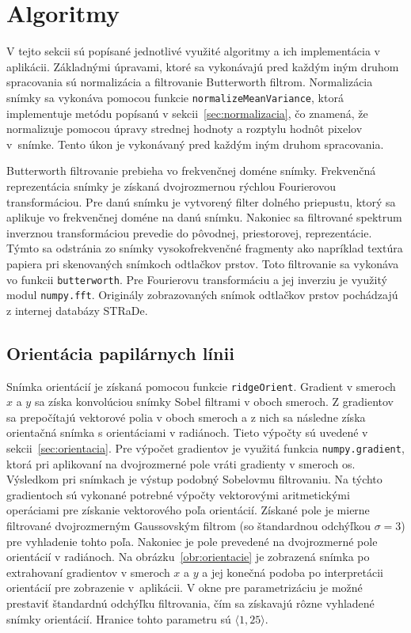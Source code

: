   \section{Algoritmy} \label{sec:algoritmy}
  V tejto sekcii sú popísané jednotlivé využité algoritmy a ich implementácia v aplikácii.
  Základnými úpravami, ktoré sa vykonávajú pred každým iným druhom spracovania sú normalizácia a filtrovanie Butterworth filtrom.
  Normalizácia snímky sa vykonáva pomocou funkcie \texttt{normalizeMeanVariance}, ktorá implementuje metódu
  popísanú v sekcii~{\ref{sec:normalizacia}}, čo znamená, že normalizuje pomocou úpravy strednej hodnoty a rozptylu hodnôt pixelov v~snímke. Tento úkon je
  vykonávaný pred každým iným druhom spracovania.

  Butterworth filtrovanie prebieha vo frekvenčnej doméne snímky. Frekvenčná reprezentácia snímky je získaná dvojrozmernou rýchlou Fourierovou transformáciou.
  Pre danú snímku je vytvorený filter dolného priepustu, ktorý sa aplikuje vo frekvenčnej doméne na danú snímku. Nakoniec sa filtrované spektrum inverznou
  transformáciou prevedie do pôvodnej, priestorovej, reprezentácie. Týmto sa odstránia zo snímky vysokofrekvenčné fragmenty ako napríklad textúra papiera
  pri skenovaných snímkoch odtlačkov prstov. Toto filtrovanie sa vykonáva vo funkcii \texttt{butterworth}. Pre Fourierovu transformáciu a jej
  inverziu je využitý modul \texttt{numpy.fft}. Originály zobrazovaných snímok odtlačkov prstov pochádzajú z internej databázy STRaDe.

  \subsection{Orientácia papilárnych línii}
  Snímka orientácií je získaná pomocou funkcie \texttt{ridgeOrient}. Gradient v smeroch $x$ a $y$ sa získa konvolúciou snímky Sobel filtrami v oboch smeroch.
  Z gradientov sa prepočítajú vektorové polia v oboch smeroch a z nich sa následne získa orientačná snímka s orientáciami v radiánoch. Tieto výpočty sú
  uvedené v sekcii~{\ref{sec:orientacia}}. Pre výpočet gradientov je využitá funkcia \texttt{numpy.gradient}, ktorá pri aplikovaní na dvojrozmerné pole
  vráti gradienty v smeroch os. Výsledkom pri snímkach je výstup podobný Sobelovmu filtrovaniu. Na týchto gradientoch sú vykonané potrebné výpočty vektorovými
  aritmetickými operáciami pre získanie vektorového poľa orientácií. Získané pole je mierne filtrované dvojrozmerným Gaussovským filtrom (so štandardnou
  odchýľkou $\sigma = 3$) pre vyhladenie tohto poľa. Nakoniec je pole prevedené na dvojrozmerné pole orientácií v radiánoch.
  Na obrázku~{\ref{obr:orientacie}} je zobrazená snímka po extrahovaní gradientov v smeroch $x$ a $y$ a jej konečná podoba po interpretácii orientácií pre
  zobrazenie v~aplikácii. V okne pre parametrizáciu je možné prestaviť štandardnú odchýľku filtrovania, čím sa získavajú rôzne vyhladené snímky orientácií.
  Hranice tohto parametru sú $\langle{}1,25\rangle{}$.


